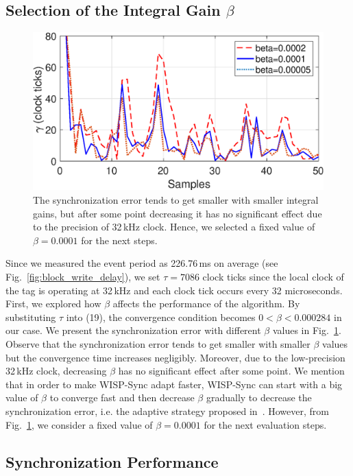 \documentclass[10pt,journal,compsoc]{IEEEtran}
\begin{document}
\subsection{Selection of the Integral Gain $\beta$} 

\begin{figure}
	\centering
	\includegraphics[width=0.85\columnwidth]{figures/integral_gain.eps}
	\caption{\label{fig:beta} The synchronization error tends to get smaller with smaller integral gains, but after some point decreasing it has no significant effect due to the precision of 32\,kHz clock. Hence, we selected a fixed value of $\beta=0.0001$ for the next steps. }
\end{figure}

Since we measured the event period as 226.76\,ms on average (see Fig.~\ref{fig:block_write_delay}), we set $\tau=7086$ 
clock ticks since the local clock of the tag is operating at 32\,kHz and each clock tick occurs every 32 microseconds. First, we explored how $\beta$ affects the performance of the algorithm. By substituting $\tau$ into (19), the convergence condition becomes $0<\beta<0.000284$ in our case. We present the synchronization error with different $\beta$ values in Fig.~\ref{fig:beta}. Observe that the synchronization error tends to get smaller with smaller $\beta$ values but the convergence time increases negligibly. Moreover, due to the low-precision 32\,kHz clock, decreasing $\beta$ has no significant effect after some point. We mention that  in order to make WISP-Sync adapt faster, WISP-Sync can start with a big value of $\beta$ to converge fast and then decrease $\beta$ gradually to decrease the synchronization error, i.e. the adaptive strategy proposed in~\cite{pi2015}. However, from  Fig.~\ref{fig:beta}, we consider a fixed value of $\beta=0.0001$ for the next evaluation steps. 

\subsection{Synchronization Performance}
\end{document}
